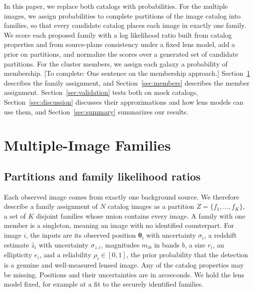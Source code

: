 \documentclass[twocolumn,twocolappendix,linenumbers]{aastex701}
\newcommand{\todo}[1]{\textcolor{red!65!black}{[To complete: #1]}}
\begin{document}
In this paper, we replace both catalogs with probabilities.
For the multiple images, we assign probabilities to complete partitions of the image catalog into families, so that every candidate catalog places each image in exactly one family.
We score each proposed family with a log likelihood ratio built from catalog properties and from source-plane consistency under a fixed lens model, add a prior on partitions, and normalize the scores over a generated set of candidate partitions.
For the cluster members, we assign each galaxy a probability of membership.
\todo{One sentence on the membership approach.}
Section~\ref{sec:families} describes the family assignment, and Section~\ref{sec:members} describes the member assignment.
Section~\ref{sec:validation} tests both on mock catalogs, Section~\ref{sec:discussion} discusses their approximations and how lens models can use them, and Section~\ref{sec:summary} summarizes our results.

\section{Multiple-Image Families}
\label{sec:families}

\subsection{Partitions and family likelihood ratios}
\label{sec:partitions}
Each observed image comes from exactly one background source.
We therefore describe a family assignment of $N$ catalog images as a partition $Z=\{f_1,\ldots,f_K\}$, a set of $K$ disjoint families whose union contains every image.
A family with one member is a singleton, meaning an image with no identified counterpart.
For image $i$, the inputs are its observed position $\boldsymbol\theta_i$ with uncertainty $\sigma_i$, a redshift estimate $\hat z_i$ with uncertainty $\sigma_{z,i}$, magnitudes $m_{ib}$ in bands $b$, a size $r_i$, an ellipticity $e_i$, and a reliability $\rho_i\in[0,1]$, the prior probability that the detection is a genuine and well-measured lensed image.
Any of the catalog properties may be missing.
Positions and their uncertainties are in arcseconds.
We hold the lens model fixed, for example at a fit to the securely identified families.
\end{document}
